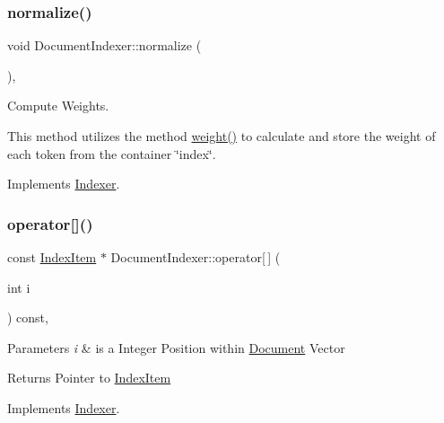 \subsubsection{\texorpdfstring{normalize()}{normalize()}}
{\footnotesize\ttfamily void Document\+Indexer\+::normalize (\begin{DoxyParamCaption}{ }\end{DoxyParamCaption})\hspace{0.3cm}{\ttfamily [override]}, {\ttfamily [virtual]}}



Compute Weights. 

This method utilizes the method \hyperlink{class_document_indexer_aa637e8bce87c52d0d78bfebe8af02f13}{weight()} to calculate and store the weight of each token from the container \char`\"{}index\char`\"{}. 

Implements \hyperlink{class_indexer_a84f50c7bac96cd5a8daa18899a39bb5d}{Indexer}.

\mbox{\label{class_document_indexer_a46bad198e100cc62dbc8f52ecc2acfeb}} 
\subsubsection{\texorpdfstring{operator[]()}{operator[]()}}
{\footnotesize\ttfamily const \hyperlink{class_index_item}{Index\+Item} $\ast$ Document\+Indexer\+::operator\mbox{[}$\,$\mbox{]} (\begin{DoxyParamCaption}\item[{int}]{i }\end{DoxyParamCaption}) const\hspace{0.3cm}{\ttfamily [override]}, {\ttfamily [virtual]}}


\begin{DoxyParams}{Parameters}
{\em i} & is a Integer Position within \hyperlink{class_document}{Document} Vector \\
\hline
\end{DoxyParams}
\begin{DoxyReturn}{Returns}
Pointer to \hyperlink{class_index_item}{Index\+Item} 
\end{DoxyReturn}


Implements \hyperlink{class_indexer}{Indexer}.

\mbox{\label{class_document_indexer_af14be24c72be4b3eb165da9c504ec7d1}} 
